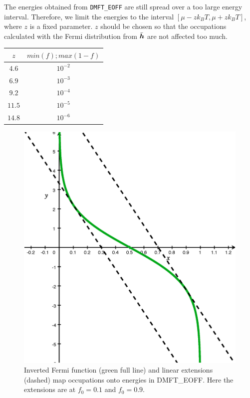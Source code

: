 \documentclass[11pt,a4paper]{report}
\begin{document}
\begin{enumerate}
  The energies obtained from \verb|DMFT_EOFF| are still spread over a
  too large energy interval. Therefore, we limit the energies to the
  interval $[\mu-zk_BT,\mu+zk_BT]$, where $z$ is a fixed
  parameter. $z$ should be chosen so that the occupations calculated
  with the Fermi distribution from $\bar{\bm{h}}$ are not affected
  too much.

\begin{center}
\begin{tabular}{|c|c|}
\hline
$z$ & $min(f); max(1-f)$ \\
\hline
$4.6$ & $10^{-2}$\\
$6.9$ & $10^{-3}$\\
$9.2$ & $10^{-4}$\\
$11.5$ & $10^{-5}$\\
$14.8$ & $10^{-6}$\\
\hline
\end{tabular}
\end{center}

\begin{figure}
\begin{center}
\includegraphics[width=0.5\linewidth]{Figs/Grapher/Eoff/eoff.eps}
\end{center}
\caption{\label{fig:eoff}Inverted Fermi function (green full line) and
  linear extensions (dashed) map occupations onto energies in
  DMFT\_EOFF. Here the extensions are at $f_0=0.1$ and $f_0=0.9$.}
\end{figure}


  



\end{enumerate}
\end{document}
